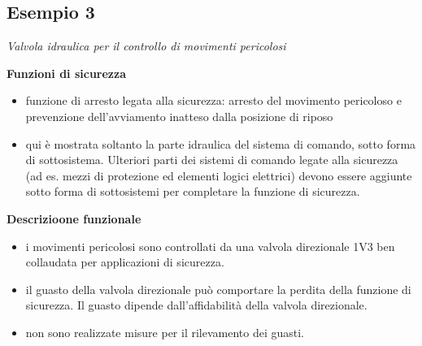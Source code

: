 \subsection{Esempio 3}
\label{sec:08-2-3}
\textit{Valvola idraulica per il controllo di movimenti pericolosi}

\begin{center}
    \begin{minipage}{\textwidth}
        \centering
        \captionsetup{hypcap=false}
        \resizebox{0.85\textwidth}{!}{}
        \label{fig:08-07}
    \end{minipage}
\end{center}

\textbf{Funzioni di sicurezza}
\begin{itemize}
    \item funzione di arresto legata alla sicurezza: arresto del movimento pericoloso e prevenzione dell'avviamento inatteso dalla posizione di riposo
    \item qui è mostrata soltanto la parte idraulica del sistema di comando, sotto forma di sottosistema. Ulteriori parti dei sistemi di comando legate alla sicurezza (ad es. mezzi di protezione ed elementi logici elettrici) devono essere aggiunte sotto forma di sottosistemi per completare la funzione di sicurezza.
\end{itemize}

\textbf{Descrizioone funzionale}
\begin{itemize}
    \item i movimenti pericolosi sono controllati da una valvola direzionale 1V3 ben collaudata per applicazioni di sicurezza.
    \item il guasto della valvola direzionale può comportare la perdita della funzione di sicurezza. Il guasto dipende dall'affidabilità della valvola direzionale.
    \item non sono realizzate misure per il rilevamento dei guasti.
\end{itemize}

